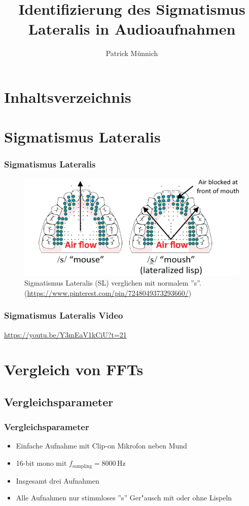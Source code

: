 \documentclass[11pt]{beamer}
\author{Patrick M\"unnich}
\title{Identifizierung des Sigmatismus Lateralis in Audioaufnahmen}
\institute{Hochschule D\"usseldorf}
\begin{document}

\section{Inhaltsverzeichnis}

\begin{frame}
\tableofcontents
\end{frame}

\section{Sigmatismus Lateralis}

\begin{frame}
\frametitle{Sigmatismus Lateralis}
\begin{figure}
\includegraphics[scale=0.4]{lateral_lisp.png}
\caption{Sigmatismus Lateralis (SL) verglichen mit normalem ''s''. (\url{https://www.pinterest.com/pin/7248049373293660/})}
\end{figure}
\end{frame}

\begin{frame}
\frametitle{Sigmatismus Lateralis Video}
\centering
\url{https://youtu.be/Y3mEaV1kCiU?t=21}
\end{frame}

\section{Vergleich von FFTs}

\subsection{Vergleichsparameter}

\begin{frame}
\frametitle{Vergleichsparameter}
\begin{itemize}
\item Einfache Aufnahme mit Clip-on Mikrofon neben Mund
\item 16-bit mono mit $f_\mathrm{sampling}=8000$\,Hz
\item Insgesamt drei Aufnahmen
\item Alle Aufnahmen nur stimmloses ''s'' Ger"ausch mit oder ohne Lispeln
\end{itemize}
\end{frame}
\end{document}
